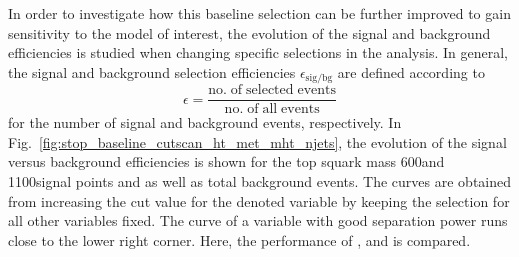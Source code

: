 In order to investigate how this baseline selection can be further improved to gain sensitivity to the model of interest, the evolution of the signal and background efficiencies is studied when changing specific selections in the analysis. In general, the signal and background selection efficiencies $\epsilon_\mathrm{sig/bg}$ are defined according to
\begin{equation}
\epsilon = \frac{\mathrm{no. \; of \; selected \; events}}{\mathrm{no. \; of \; all \; events}}
\end{equation} 
for the number of signal and background events, respectively. In Fig.~\ref{fig:stop_baseline_cutscan_ht_met_mht_njets}, the evolution of the signal versus background efficiencies is shown for the top squark mass 600\gev and 1100\gev signal points and \ttbar as well as total background events. The curves are obtained from increasing the cut value for the denoted variable by keeping the selection for all other variables fixed. The curve of a variable with good separation power runs close to the lower right corner. Here, the performance of \HT, \met and \NJets is compared. 
